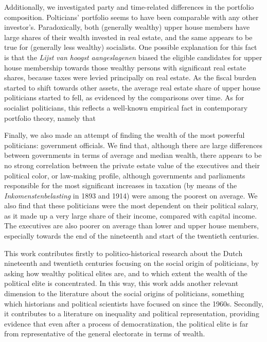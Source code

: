     Additionally, we investigated party and time-related differences in the portfolio composition. Polticians' portfolio seems to have been comparable with any other investor's. Paradoxically, both (generally wealthy) upper house members have large shares of their wealth invested in real estate, and the same appears to be true for (generally less wealthy) socialists. One possible explanation for this fact is that the \textit{Lijst van hoogst aangeslagenen} biased the eligible candidates for upper house membership towards those wealthy persons with significant real estate shares, because taxes were levied principally on real estate. As the fiscal burden started to shift towards other assets, the average real estate share of upper house politicians started to fell, as evidenced by the comparisons over time. As for socialist politicians, this reflects a well-known empirical fact in contemporary portfolio theory, namely that 

    Finally, we also made an attempt of finding the wealth of the most powerful politicians: government officials. We find that, although there are large differences between governments in terms of average and median wealth, there appears to be no strong correlation between the private estate value of the executives and their political color, or law-making profile, although governments and parliaments responsible for the most significant increases in taxation (by means of the \textit{Inkomenstenbelasting} in 1893 and 1914) were among the poorest on average. We also find that these politicians were the most dependent on their political salary, as it made up a very large share of their income, compared with capital income. The executives are also poorer on average than lower and upper house members, especially towards the end of the nineteenth and start of the twentieth centuries.

    This work contributes firstly to politico-historical research about the Dutch nineteenth and twentieth centuries focusing on the social origin of politicians, by asking how wealthy political elites are, and to which extent the wealth of the political elite is concentrated. \autocite{van1983toegang, secker1989social, secker1991ministers, van1999eerste, moes2012onder} In this way, this work adds another relevant dimension to the literature about the social origins of politicians, something which historians and political scientists have focused on since the 1960s.\autocite{dogan1967filieres,van1983toegang} Secondly, it contributes to a literature on inequality and political representation, providing evidence that even after a process of democratization, the political elite is far from representative of the general electorate in terms of wealth.\autocite{dalton1985political}

